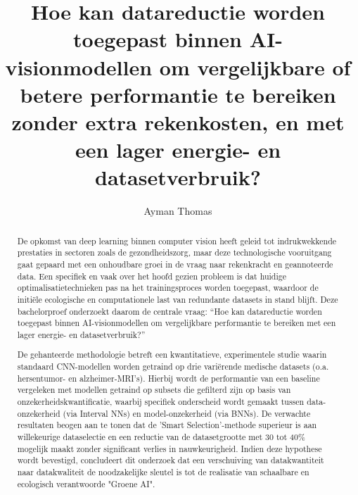 \documentclass{hogent-article}
\title{Hoe kan datareductie worden toegepast binnen AI-visionmodellen om vergelijkbare of betere performantie te bereiken zonder extra rekenkosten, en met een lager energie- en datasetverbruik?}
\author{Ayman Thomas}
\begin{document}
\begin{abstract}
De opkomst van deep learning binnen computer vision heeft geleid tot indrukwekkende prestaties in sectoren zoals de gezondheidszorg, maar deze technologische vooruitgang gaat gepaard met een onhoudbare groei in de vraag naar rekenkracht en geannoteerde data. Een specifiek en vaak over het hoofd gezien probleem is dat huidige optimalisatietechnieken pas na het trainingsproces worden toegepast, waardoor de initiële ecologische en computationele last van redundante datasets in stand blijft. Deze bachelorproef onderzoekt daarom de centrale vraag: “Hoe kan datareductie worden toegepast binnen AI-visionmodellen om vergelijkbare performantie te bereiken met een lager energie- en datasetverbruik?”

De gehanteerde methodologie betreft een kwantitatieve, experimentele studie waarin standaard CNN-modellen worden getraind op drie variërende medische datasets (o.a. hersentumor- en alzheimer-MRI's). Hierbij wordt de performantie van een baseline vergeleken met modellen getraind op subsets die gefilterd zijn op basis van onzekerheidskwantificatie, waarbij specifiek onderscheid wordt gemaakt tussen data-onzekerheid (via Interval NNs) en model-onzekerheid (via BNNs). De verwachte resultaten beogen aan te tonen dat de 'Smart Selection'-methode superieur is aan willekeurige dataselectie en een reductie van de datasetgrootte met 30 tot 40\% mogelijk maakt zonder significant verlies in nauwkeurigheid. Indien deze hypothese wordt bevestigd, concludeert dit onderzoek dat een verschuiving van datakwantiteit naar datakwaliteit de noodzakelijke sleutel is tot de realisatie van schaalbare en ecologisch verantwoorde "Groene AI".
\end{abstract}

\tableofcontents



\printbibliography[heading=bibintoc]
\end{document}
